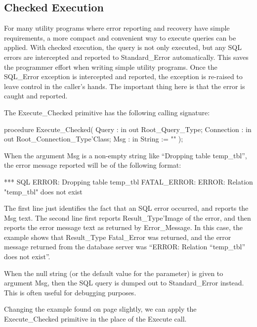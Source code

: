 \documentclass[english,letterpaper]{book}
\begin{document}
\subsection{Checked Execution}

For many utility programs where error reporting
and recovery have simple requirements, a more compact and convenient
way to execute queries can be applied. With checked execution, the
query is not only executed, but any SQL errors are intercepted and
reported to Standard\_Error automatically. This saves the programmer
effort when writing simple utility programs. Once the SQL\_Error exception
is intercepted and reported, the exception is re-raised to leave control
in the caller's hands. The important thing here is that the error
is caught and reported.

The Execute\_Checked primitive has the following calling signature:

\begin{Code}
procedure Execute_Checked(
   Query :      in out Root_Query_Type;
   Connection : in out Root_Connection_Type'Class;
   Msg :        in     String := ""
);
\end{Code}

When the argument Msg is a non-empty string like ``Dropping table
temp\_tbl'', the error message reported will be of the following
format:

\begin{Example}
*** SQL ERROR: Dropping table temp_tbl
FATAL_ERROR: ERROR: Relation "temp_tbl" does not exist
\end{Example}

The first line just identifies the fact that an SQL error occurred,
and reports the Msg text. The second line first reports Result\_Type'Image
of the error, and then reports the error message text as returned
by Error\_Message. In this case, the example shows that Result\_Type
Fatal\_Error was returned, and the error message returned from the
database server was ``ERROR: Relation ``temp\_tbl'' does not
exist''.

When the null string (or the default value for
the parameter) is given to argument Msg, then the SQL query is dumped
out to Standard\_Error instead. This is often useful for debugging
purposes.

Changing the example found on page \pageref{Birthday Timezone Example}
slightly, we can apply the Execute\_Checked primitive in the place
of the Execute call.
\end{document}
